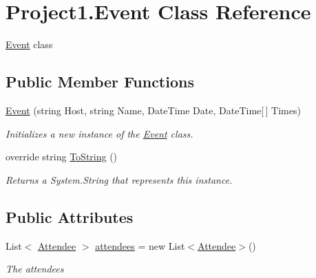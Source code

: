 \hypertarget{class_project1_1_1_event}{}\section{Project1.\+Event Class Reference}
\label{class_project1_1_1_event}


\hyperlink{class_project1_1_1_event}{Event} class  


\subsection*{Public Member Functions}
\begin{DoxyCompactItemize}
\item 
\hyperlink{class_project1_1_1_event_a55c477aa9e921902fd85ff505c93b661}{Event} (string Host, string Name, Date\+Time Date, Date\+Time\mbox{[}$\,$\mbox{]} Times)
\begin{DoxyCompactList}\small\item\em Initializes a new instance of the \hyperlink{class_project1_1_1_event}{Event} class. \end{DoxyCompactList}\item 
override string \hyperlink{class_project1_1_1_event_a0e234eb98d62ce49bd5ed4c658e307ff}{To\+String} ()
\begin{DoxyCompactList}\small\item\em Returns a System.\+String that represents this instance. \end{DoxyCompactList}\end{DoxyCompactItemize}
\subsection*{Public Attributes}
\begin{DoxyCompactItemize}
\item 
List$<$ \hyperlink{class_project1_1_1_attendee}{Attendee} $>$ \hyperlink{class_project1_1_1_event_ab84e6fa3b0d021689d80c02e4d23731b}{attendees} = new List$<$\hyperlink{class_project1_1_1_attendee}{Attendee}$>$()
\begin{DoxyCompactList}\small\item\em The attendees \end{DoxyCompactList}\end{DoxyCompactItemize}
